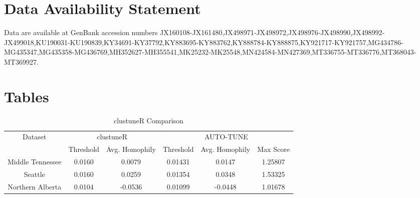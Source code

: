 \documentclass[utf8]{FrontiersinHarvard} %
\newcommand{\TODO}[1]{{\color{red}{#1}}}
\begin{document}
\section*{Data Availability Statement}

Data are available at GenBank accession numbers
JX160108-JX161480,JX498971-JX498972,JX498976-JX498990,JX498992-JX499018,KU190031-KU190839,KY34691-KY37792,KY883695-KY883762,KY888784-KY888875,KY921717-KY921757,MG434786-MG435347,MG435358-MG436769,MH352627-MH355541,MK25232-MK25548,MN424584-MN427369,MT336755-MT336776,MT368043-MT369927.


\nocite{*}


\section*{Tables}

\TODO{Add p-values for DWH}

\begin{table}[h]
	\caption{clustuneR Comparison}
	\vspace{8pt}
	\centering
	\label{tab:homophily}
	\begin{tabular}{|c|c|c|c|c|c|}
		\hline
		Dataset          & \multicolumn{2}{c|}{clustuneR} & \multicolumn{3}{c|}{AUTO-TUNE}                                          \\
		\cline{2-6}
		                 & Threshold                      & Avg. Homophily                 & Threshold & Avg. Homophily & Max Score \\
		\hline
		Middle Tennessee & 0.0160                         & 0.0079                         & 0.01431   & 0.0147         & 1.25807   \\
		Seattle          & 0.0160                         & 0.0259                         & 0.01354   & 0.0348         & 1.53325   \\
		Northern Alberta & 0.0104                         & -0.0536                        & 0.01099   & -0.0448        & 1.01678   \\
		\hline
	\end{tabular}
\end{table}
\end{document}
